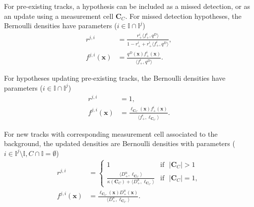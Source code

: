 \documentclass[journal]{IEEEtran}
\begin{document}
For pre-existing tracks, a hypothesis can be included as a missed detection, or as an update using a measurement cell $\mathbf{C}_C$. For missed detection hypotheses, the Bernoulli densities have parameters ($i\in\mathbb{I}\cap\mathbb{I}^j$)
\begin{subequations}
\begin{align}
    r^{j,i} &= \frac{r^i_+\langle f_+^i,q^D\rangle}{1-r_+^i+r^i_+\langle f_+^i,q^D\rangle},\\
    f^{j,i}(\mathbf{x}) &= \frac{q^D(\mathbf{x})f^i_+(\mathbf{x})}{\langle f^i_+,q^D\rangle}.
\end{align}
\label{eq:missUpdate}
\end{subequations}
\mbox{}\par\nobreak
\noindent
For hypotheses updating pre-existing tracks, the Bernoulli densities have parameters ($i\in\mathbb{I}\cap\mathbb{I}^j$)
\begin{subequations}
\begin{align}
    r^{j,i} &= 1,\\
    f^{j,i}(\mathbf{x}) &= \frac{\ell_{\mathbf{C}_C}(\mathbf{x})f^i_+(\mathbf{x})}{\langle f^i_+,\ell_{\mathbf{C}_C}\rangle}.
\end{align}
\label{eq:measUpdate}
\end{subequations}
\mbox{}\par\nobreak
\noindent
For new tracks with corresponding measurement cell associated to the background, the updated densities are Bernoulli densities with parameters ($i\in\mathbb{I}^j\setminus\mathbb{I}, C\cap\mathbb{I}=\emptyset$)
\begin{subequations}
\begin{align}
    r^{j,i} &=
    \begin{cases} 
      1 & \text{if}~~~ |\mathbf{C}_C|>1 \\
      \frac{\langle D^u_+,\ell_{\mathbf{C}_C}\rangle}{\kappa(\mathbf{C}_C)+\langle D^u_+,\ell_{\mathbf{C}_C}\rangle} & \text{if}~~~ |\mathbf{C}_C|=1,
   \end{cases}\\
    f^{j,i}(\mathbf{x}) &= \frac{\ell_{\mathbf{C}_C}(\mathbf{x})D^u_+(\mathbf{x})}{\langle D^u_+,\ell_{\mathbf{C}_C}\rangle}.
\end{align}
\label{eq:newUpdate}
\end{subequations}
\end{document}
